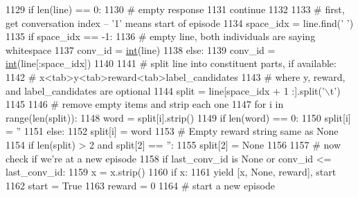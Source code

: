 \begin{DoxyCode}
1129                 \textcolor{keywordflow}{if} len(line) == 0:
1130                     \textcolor{comment}{# empty response}
1131                     \textcolor{keywordflow}{continue}
1132 
1133                 \textcolor{comment}{# first, get conversation index -- '1' means start of episode}
1134                 space\_idx = line.find(\textcolor{stringliteral}{' '})
1135                 \textcolor{keywordflow}{if} space\_idx == -1:
1136                     \textcolor{comment}{# empty line, both individuals are saying whitespace}
1137                     conv\_id = \hyperlink{namespacelanguage__model_1_1eval__ppl_a7d12ee00479673c5c8d1f6d01faa272a}{int}(line)
1138                 \textcolor{keywordflow}{else}:
1139                     conv\_id = \hyperlink{namespacelanguage__model_1_1eval__ppl_a7d12ee00479673c5c8d1f6d01faa272a}{int}(line[:space\_idx])
1140 
1141                 \textcolor{comment}{# split line into constituent parts, if available:}
1142                 \textcolor{comment}{# x<tab>y<tab>reward<tab>label\_candidates}
1143                 \textcolor{comment}{# where y, reward, and label\_candidates are optional}
1144                 split = line[space\_idx + 1 :].split(\textcolor{stringliteral}{'\(\backslash\)t'})
1145 
1146                 \textcolor{comment}{# remove empty items and strip each one}
1147                 \textcolor{keywordflow}{for} i \textcolor{keywordflow}{in} range(len(split)):
1148                     word = split[i].strip()
1149                     \textcolor{keywordflow}{if} len(word) == 0:
1150                         split[i] = \textcolor{stringliteral}{''}
1151                     \textcolor{keywordflow}{else}:
1152                         split[i] = word
1153                 \textcolor{comment}{# Empty reward string same as None}
1154                 \textcolor{keywordflow}{if} len(split) > 2 \textcolor{keywordflow}{and} split[2] == \textcolor{stringliteral}{''}:
1155                     split[2] = \textcolor{keywordtype}{None}
1156 
1157                 \textcolor{comment}{# now check if we're at a new episode}
1158                 \textcolor{keywordflow}{if} last\_conv\_id \textcolor{keywordflow}{is} \textcolor{keywordtype}{None} \textcolor{keywordflow}{or} conv\_id <= last\_conv\_id:
1159                     x = x.strip()
1160                     \textcolor{keywordflow}{if} x:
1161                         \textcolor{keywordflow}{yield} [x, \textcolor{keywordtype}{None}, reward], start
1162                     start = \textcolor{keyword}{True}
1163                     reward = 0
1164                     \textcolor{comment}{# start a new episode}

\end{DoxyCode}
